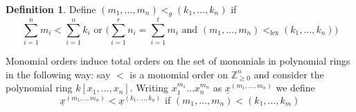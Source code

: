\documentclass[12pt]{article}
\theoremstyle{plain}
\theoremstyle{definition}
\newtheorem{defn}[thm]{Definition} %
\newcommand{\bb}[1]{\mathbb{#1}}
\begin{document}
\begin{defn}\label{def:graded_lexico}
	Define $(m_1,\hdots, m_n) <_g (k_1,\hdots, k_n)$ if
	\begin{equation}
		\sum_{i=1}^n m_i < \sum_{i = 1}^n k_i\text{ or } \Big(\sum_{i=1}^r n_i = \sum_{i = 1}^t m_i \text{ and }(m_1, \hdots, m_n) <_{\operatorname{lex}}(k_1,\hdots, k_n)\Big)
		\end{equation}
	\end{defn}
Monomial orders induce total orders on the set of monomials in polynomial rings in the following way: say $<$ is a monomial order on $\bb{Z}_{\geq 0}^n$ and consider the polynomial ring $k[x_1,...,x_n]$. Writing $x_1^{m_1}\hdots x_n^{m_n}$ as $\underline{x}^{(m_1,...,m_n)}$ we define
\begin{equation}
	\underline{x}^{(m_1,..,m_n)} < \underline{x}^{(k_1,...,k_n)} \text{ if }(m_1,\hdots,m_n) < (k_1,\hdots,k_m)
	\end{equation}
\end{document}
